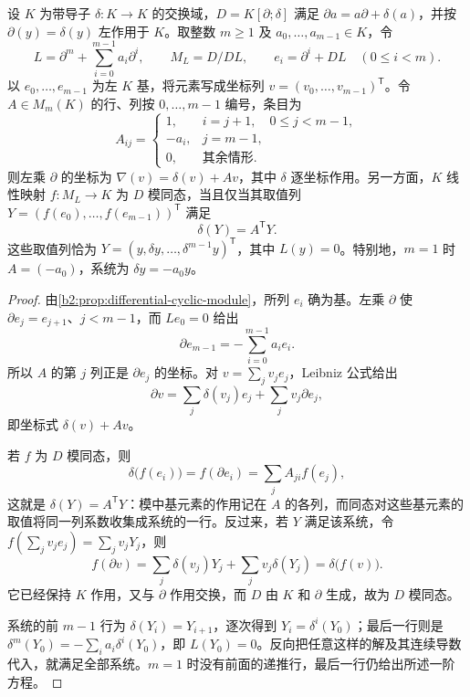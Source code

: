 \begin{proposition}\label{b2:prop:differential-companion-coordinates}
	设 \(K\) 为带导子 \(\delta:K\to K\) 的交换域，\(D=K[\partial;\delta]\) 满足 \(\partial a=a\partial+\delta(a)\)，并按 \(\partial(y)=\delta(y)\) 左作用于 \(K\)。取整数 \(m\ge1\) 及 \(a_0,\ldots,a_{m-1}\in K\)，令
	\[
		L=\partial^m+\sum_{i=0}^{m-1}a_i\partial^i,\qquad M_L=D/DL,\qquad e_i=\partial^i+DL\quad(0\le i<m).
	\]
	以 \(e_0,\ldots,e_{m-1}\) 为左 \(K\) 基，将元素写成坐标列 \(v=(v_0,\ldots,v_{m-1})^{\mathsf T}\)。令 \(A\in M_m(K)\) 的行、列按 \(0,\ldots,m-1\) 编号，条目为
	\[
		A_{ij}=
		\begin{cases}
			1,&i=j+1,\quad 0\le j<m-1,\\
			-a_i,&j=m-1,\\
			0,&\text{其余情形}.
		\end{cases}
	\]
	则左乘 \(\partial\) 的坐标为 \(\nabla(v)=\delta(v)+Av\)，其中 \(\delta\) 逐坐标作用。另一方面，\(K\) 线性映射 \(f:M_L\to K\) 为 \(D\) 模同态，当且仅当其取值列 \(Y=(f(e_0),\ldots,f(e_{m-1}))^{\mathsf T}\) 满足
	\[
		\delta(Y)=A^{\mathsf T}Y.
	\]
	这些取值列恰为 \(Y=(y,\delta y,\ldots,\delta^{m-1}y)^{\mathsf T}\)，其中 \(L(y)=0\)。特别地，\(m=1\) 时 \(A=(-a_0)\)，系统为 \(\delta y=-a_0y\)。
\end{proposition}
\begin{proof}
	由\cref{b2:prop:differential-cyclic-module}，所列 \(e_i\) 确为基。左乘 \(\partial\) 使 \(\partial e_j=e_{j+1}\)、\(j<m-1\)，而 \(Le_0=0\) 给出
	\[
		\partial e_{m-1}=-\sum_{i=0}^{m-1}a_ie_i.
	\]
	所以 \(A\) 的第 \(j\) 列正是 \(\partial e_j\) 的坐标。对 \(v=\sum_jv_je_j\)，Leibniz 公式给出
	\[
		\partial v=\sum_j\delta(v_j)e_j+\sum_jv_j\partial e_j,
	\]
	即坐标式 \(\delta(v)+Av\)。

	若 \(f\) 为 \(D\) 模同态，则
	\[
		\delta\bigl(f(e_i)\bigr)=f(\partial e_i) =\sum_j A_{ji}f(e_j),
	\]
	这就是 \(\delta(Y)=A^{\mathsf T}Y\)：模中基元素的作用记在 \(A\) 的各列，而同态对这些基元素的取值将同一列系数收集成系统的一行。反过来，若 \(Y\) 满足该系统，令 \(f(\sum_jv_je_j)=\sum_jv_jY_j\)，则
	\[
		f(\partial v) =\sum_j\delta(v_j)Y_j+\sum_jv_j\delta(Y_j) =\delta\bigl(f(v)\bigr).
	\]
	它已经保持 \(K\) 作用，又与 \(\partial\) 作用交换，而 \(D\) 由 \(K\) 和 \(\partial\) 生成，故为 \(D\) 模同态。

	系统的前 \(m-1\) 行为 \(\delta(Y_i)=Y_{i+1}\)，逐次得到 \(Y_i=\delta^i(Y_0)\)；最后一行则是 \(\delta^m(Y_0)=-\sum_i a_i\delta^i(Y_0)\)，即 \(L(Y_0)=0\)。反向把任意这样的解及其连续导数代入，就满足全部系统。\(m=1\) 时没有前面的递推行，最后一行仍给出所述一阶方程。
\end{proof}


